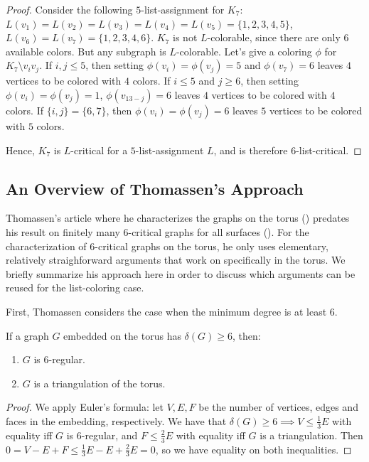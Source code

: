 \begin{proof}
Consider the following $5$-list-assignment for $K_7$: $L(v_1) = L(v_2) = L(v_3) = L(v_4) = L(v_5) = \{1, 2, 3, 4, 5\}$, 
$L(v_6) = L(v_7) = \{1, 2, 3, 4, 6\}$. $K_7$ is not $L$-colorable, since there are only $6$ available colors. 
But any subgraph is $L$-colorable. Let's give a coloring $\phi$ for $K_7 \setminus v_iv_j$. If $i, j \leq 5$, 
then setting $\phi(v_i) = \phi(v_j) = 5$ and $\phi(v_7) = 6$ leaves $4$ vertices to be colored with $4$ colors. 
If $i \leq 5$ and $j \geq 6$, then setting $\phi(v_i) = \phi(v_j) = 1$, $\phi(v_{13-j}) = 6$ leaves $4$ vertices 
to be colored with $4$ colors. If $\{i, j\} = \{6, 7\}$, then $\phi(v_i) = \phi(v_j) = 6$ leaves $5$ vertices 
to be colored with $5$ colors.

Hence, $K_7$ is $L$-critical for a $5$-list-assignment $L$, and is therefore $6$-list-critical.
\end{proof}

\subsection{An Overview of Thomassen's Approach}

Thomassen's article where he characterizes the graphs on the torus (\cite{thomassentorus}) predates 
his result on finitely many $6$-critical graphs for all surfaces (\cite{thomassenfixedsurface}). 
For the characterization of $6$-critical graphs on the torus, he only uses elementary, relatively 
straighforward arguments that work on specifically in the torus. We briefly summarize his 
approach here in order to discuss which arguments can be reused for the list-coloring case. 

First, Thomassen considers the case when the minimum degree is at least $6$. 

\begin{proposition}
If a graph $G$ embedded on the torus has $\delta(G) \geq 6$, then:

\begin{enumerate}
	\item $G$ is $6$-regular.
	\item $G$ is a triangulation of the torus.
\end{enumerate}
\end{proposition}

\begin{proof}
We apply Euler's formula: let $V, E, F$ be the number of vertices, edges and faces in the embedding, respectively. 
We have that $\delta(G) \geq 6 \implies V \leq \frac{1}{3} E$ with equality iff $G$ is $6$-regular, and $F \leq \frac{2}{3}E$ 
with equality iff $G$ is a triangulation. Then $0 = V - E + F \leq \frac{1}{3}E - E + \frac{2}{3}E = 0$, so we have equality on both inequalities.
\end{proof}


